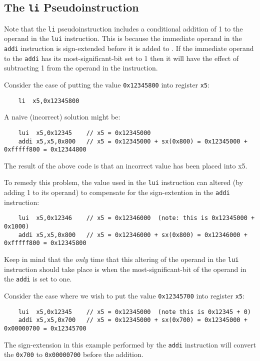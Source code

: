 \subsection{The {\tt li} Pseudoinstruction}

Note that the {\tt li} pseudoinstruction includes a conditional addition of 1 to the operand
in the {\tt lui} instruction.  This is because the immediate operand in the
{\tt addi} instruction is sign-extended before it is added to \verb@rd@.
If the immediate operand to the {\tt addi} has its most-significant-bit set to 1 then
it will have the effect of subtracting 1 from the operand in the \verb@lui@ instruction.

Consider the case of putting the value {\tt 0x12345800} into register {\tt x5}:

{\small
\begin{verbatim}
    li  x5,0x12345800
\end{verbatim}
}
{\color{red}
A naive (incorrect) solution might be:
{\small
\begin{verbatim}
    lui  x5,0x12345    // x5 = 0x12345000
    addi x5,x5,0x800   // x5 = 0x12345000 + sx(0x800) = 0x12345000 + 0xfffff800 = 0x12344800
\end{verbatim}
}
The result of the above code is that an incorrect value has been placed into x5.  
}

To remedy this problem, the value used in the {\tt lui} instruction can altered 
(by adding 1 to its operand) to compensate for the sign-extention in the {\tt addi} 
instruction:
{\small
\begin{verbatim}
    lui  x5,0x12346    // x5 = 0x12346000  (note: this is 0x12345000 + 0x1000)
    addi x5,x5,0x800   // x5 = 0x12346000 + sx(0x800) = 0x12346000 + 0xfffff800 = 0x12345800
\end{verbatim}
}
Keep in mind that the {\em only} time that this altering of the operand in the {\tt lui}
instruction should take place is when the most-significant-bit of the operand in the
{\tt addi} is set to one.

Consider the case where we wish to put the value {\tt 0x12345700} into register {\tt x5}:
{\small
\begin{verbatim}
    lui  x5,0x12345    // x5 = 0x12345000  (note this is 0x12345 + 0)
    addi x5,x5,0x700   // x5 = 0x12345000 + sx(0x700) = 0x12345000 + 0x00000700 = 0x12345700
\end{verbatim}
}
The sign-extension in this example performed by the {\tt addi} instruction will convert the
{\tt 0x700} to {\tt 0x00000700} before the addition.

